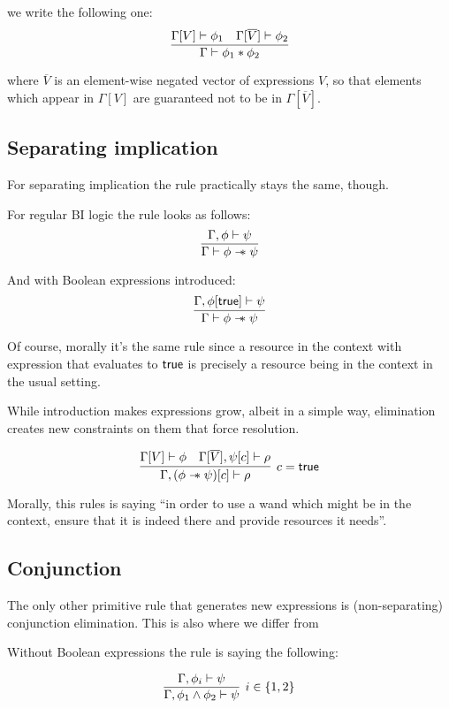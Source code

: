 we write the following one:
\[\infer{\Gamma \vdash \phi_1 \ast \phi_2}
      {\Gamma[V] \vdash \phi_1 &
       \Gamma[\overline{V}] \vdash \phi_2}\]

where \(\overline{V}\) is an element-wise negated vector of expressions \(V\), so
that elements which appear in \(\Gamma[V]\) are guaranteed not to be in \(\Gamma[\overline{V}]\).

\subsection{Separating implication}

For separating implication the rule practically stays the same, though.

For regular BI logic the rule looks as follows:
\[
\infer{\Gamma \vdash \phi \wand \psi}
      {\Gamma , \phi \vdash \psi}
\]

And with Boolean expressions introduced:
\[
\infer{\Gamma \vdash \phi \wand \psi}
      {\Gamma , \phi[\true] \vdash \psi}
\]

Of course, morally it's the same rule since a resource in the context with expression that evaluates to \(\textsf{true}\) is precisely a resource being in the context in the usual setting.

While introduction makes expressions grow, albeit in a simple way, elimination creates new constraints on them that force resolution.

\[
\infer[ c = \true ]
      {\Gamma, (\phi \wand \psi)[c] \vdash \rho}
      {\Gamma[V] \vdash \phi &
       \Gamma[\overline{V}], \psi[c] \vdash \rho}
\]

Morally, this rules is saying ``in order to use a wand which might be in the context, ensure that it is indeed there and provide resources it needs''.

\subsection{Conjunction}

The only other primitive rule that generates new expressions is (non-separating) conjunction elimination.
This is also where we differ from \citet{harlandResourceDistributionBooleanConstraints2003}

Without Boolean expressions the rule is saying the following:

\[
\infer[ i \in \{1,2\} ]
      {\Gamma, \phi_1 \wedge \phi_2 \vdash \psi}
      {\Gamma, \phi_i \vdash \psi}
\]

